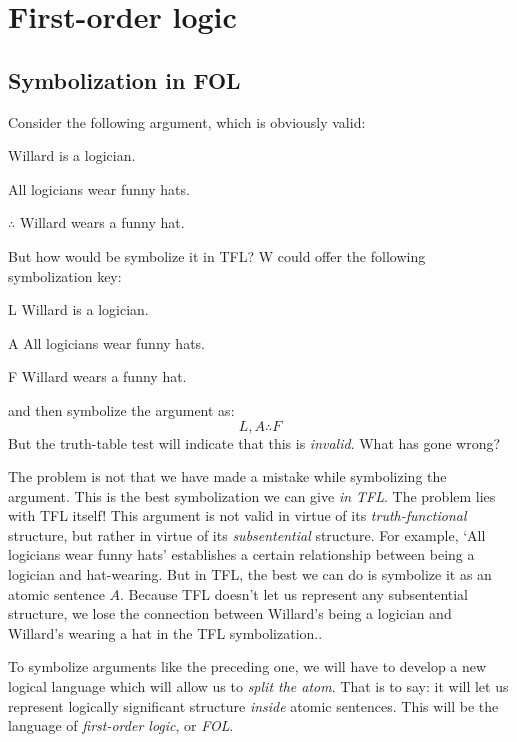 \part{First-order logic}\label{p:FOL}

\chapter{Symbolization in FOL}\label{ch:FOLSymbolization}


Consider the following argument, which is obviously valid:
\begin{earg}
\item[] Willard is a logician.
\item[] All logicians wear funny hats.
\item[$\therefore$] Willard wears a funny hat.
\end{earg}
But how would be symbolize it in TFL? W could offer the following symbolization key:
\begin{ekey}
\item[L] Willard is a logician.
\item[A] All logicians wear funny hats.
\item[F] Willard wears a funny hat.
\end{ekey}
and then symbolize the argument as:
$$L, A \therefore F$$
But the truth-table test will indicate that this is \emph{invalid}. What has gone wrong?

The problem is not that we have made a mistake while symbolizing the argument. This is the best symbolization we can give \emph{in TFL}. The problem lies with TFL itself! This argument is not valid in virtue of its \emph{truth-functional} structure, but rather in virtue of its \emph{subsentential} structure.  For example, `All logicians wear funny hats' establishes a certain relationship between being a logician and hat-wearing. But in TFL, the best we can do is symbolize it as an atomic sentence $A$.  Because TFL doesn't let us represent any subsentential structure, we lose the connection between Willard's being a logician and Willard's wearing a hat in the TFL symbolization..

To symbolize arguments like the preceding one, we will have to develop a new logical language which will allow us to \emph{split the atom}.  That is to say: it will let us represent logically significant structure \emph{inside} atomic sentences. This will be the language of \emph{first-order logic}, or \emph{FOL}.


